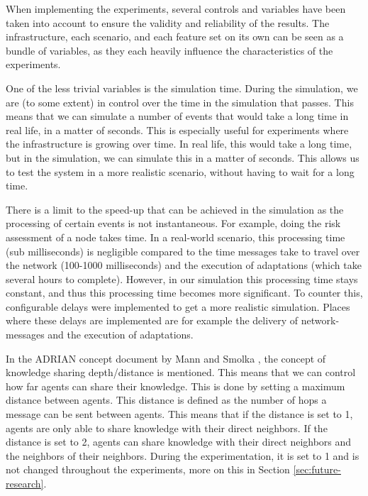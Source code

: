 When implementing the experiments, several controls and variables have been taken into account to ensure the validity and reliability of the results. The infrastructure, each scenario, and each feature set on its own can be seen as a bundle of variables, as they each heavily influence the characteristics of the experiments. 


\label{sssec:simulation-time}
One of the less trivial variables is the simulation time. During the simulation, we are (to some extent) in control over the time in the simulation that passes. This means that we can simulate a number of events that would take a long time in real life, in a matter of seconds. This is especially useful for  experiments where the infrastructure is growing over time. In real life, this would take a long time, but in the simulation, we can simulate this in a matter of seconds. This allows us to test the system in a more realistic scenario, without having to wait for a long time.

There is a limit to the speed-up that can be achieved in the simulation as the processing of certain events is not instantaneous. For example, doing the risk assessment of a node takes time. In a real-world scenario, this processing time (sub milliseconds) is negligible compared to the time messages take to travel over the network (100-1000 milliseconds) and the execution of adaptations (which take several hours to complete). However, in our simulation this processing time stays constant, and thus this processing time becomes more significant. To counter this, configurable delays were implemented to get a more realistic simulation. 
Places where these delays are implemented are for example the delivery of network-messages and the execution of adaptations. 

\label{sssec:knowledge-depth}
In the ADRIAN concept document by Mann and Smolka \cite{mann2023ADRIAN}, the concept of knowledge sharing depth/distance is mentioned.  This means that we can control how far agents can share their knowledge. This is done by setting a maximum distance between agents. This distance is defined as the number of hops a message can be sent between agents. This means that if the distance is set to 1, agents are only able to share knowledge with their direct neighbors. If the distance is set to 2, agents can share knowledge with their direct neighbors and the neighbors of their neighbors. During the experimentation, it is set to 1 and is not changed throughout the experiments, more on this in Section \ref{sec:future-research}.

